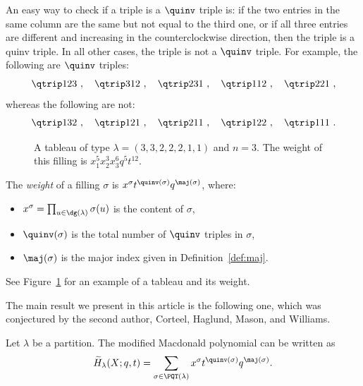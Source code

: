 \begin{remark} An easy way to check if a triple is a $\quinv$ triple is: if the two entries in the same column are the same but not equal to the third one, or if all three entries are different and increasing in the counterclockwise direction, then the triple is a quinv triple. In all other cases, the triple is not a $\quinv$ triple. For example, the following are $\quinv$ triples: 
\[
\qtrip 123\ ,\quad 
\qtrip 312\ ,\quad 
\qtrip 231\ ,\quad
\qtrip 112\ , \quad
\qtrip 221\ ,
\]
whereas the following are not:
\[
\qtrip 132\ , \quad
\qtrip 121\ , \quad
\qtrip 211\ , \quad
\qtrip 122\ , \quad
\qtrip 111\ .
\]
\end{remark}


 \begin{figure}[ht!]
  \centering
  \caption{A tableau of type $\lambda=(3,3,2,2,2,1,1)$ and $n=3$. The weight of this filling is $x_1^5x_2^3x_3^6  q^5 t^{12}$.}\label{fig:polyqueue}
 \end{figure}

 
\begin{defn}\label{def:stats}
The \emph{weight} of a filling $\sigma$ is $x^{\sigma}t^{\quinv(\sigma)}q^{\maj(\sigma)}$, where:
\begin{itemize}
\item $x^{\sigma}=\prod_{u\in\dg(\lambda)}\sigma(u)$ is the content of $\sigma$,
\item $\quinv(\sigma)$ is the total number of $\quinv$ triples in $\sigma$,
\item $\maj(\sigma)$ is the major index given in Definition~\ref{def:maj}.
 \end{itemize}
 \end{defn}
 
See Figure~\ref{fig:polyqueue} for an example of a tableau and its
weight.


The main result we present in this article is the following one, 
which was conjectured by the second author, Corteel, Haglund, Mason, and Williams.
\begin{theorem}
\label{thm:mainconj}
Let $\lambda$ be a partition. The modified Macdonald polynomial can be written as
\[
\widetilde{H}_{\lambda}(X;q,t) = \sum_{\sigma\in\PQT(\lambda)} x^{\sigma}t^{\quinv(\sigma)}q^{\maj(\sigma)}.
\]
\end{theorem}

